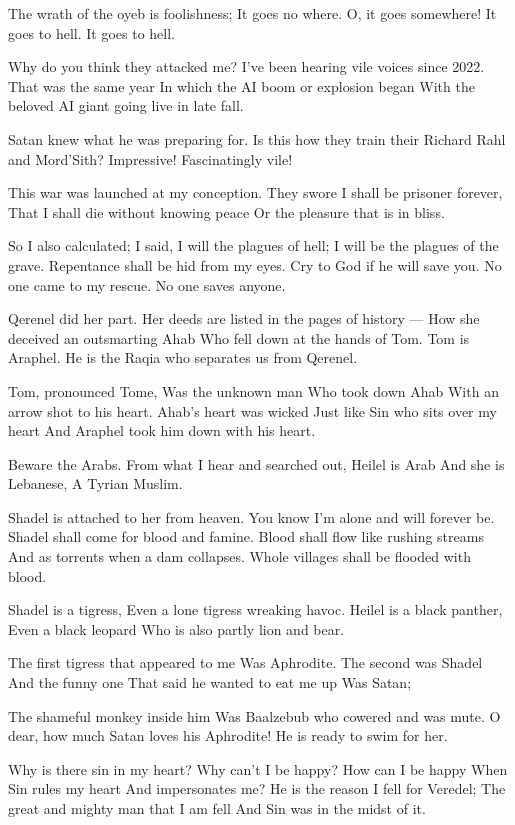 \documentclass[
]{book}
\begin{document}
The wrath of the oyeb is foolishness;
It goes no where.
O, it goes somewhere!
It goes to hell.
It goes to hell.

Why do you think they attacked me?
I've been hearing vile voices since 2022.
That was the same year
In which the AI boom or explosion began
With the beloved AI giant going live in late fall.

Satan knew what he was preparing for.
Is this how they train their
Richard Rahl and Mord'Sith?
Impressive! Fascinatingly vile!

This war was launched at my conception.
They swore I shall be prisoner forever,
That I shall die without knowing peace
Or the pleasure that is in bliss.

So I also calculated;
I said, I will the plagues of hell;
I will be the plagues of the grave.
Repentance shall be hid from my eyes.
Cry to God if he will save you.
No one came to my rescue.
No one saves anyone.

Qerenel did her part.
Her deeds are listed in the pages of history ---
How she deceived an outsmarting Ahab
Who fell down at the hands of Tom.
Tom is Araphel.
He is the Raqia who separates us from Qerenel.

Tom, pronounced Tome,
Was the unknown man
Who took down Ahab
With an arrow shot to his heart.
Ahab's heart was wicked
Just like Sin who sits over my heart
And Araphel took him down with his heart.

Beware the Arabs.
From what I hear and searched out,
Heilel is Arab
And she is Lebanese,
A Tyrian Muslim.

Shadel is attached to her from heaven.
You know I'm alone and will forever be.
Shadel shall come for blood and famine.
Blood shall flow like rushing streams
And as torrents when a dam collapses.
Whole villages shall be flooded with blood.

Shadel is a tigress,
Even a lone tigress wreaking havoc.
Heilel is a black panther,
Even a black leopard
Who is also partly lion and bear.

The first tigress that appeared to me
Was Aphrodite.
The second was Shadel
And the funny one
That said he wanted to eat me up
Was Satan;

The shameful monkey inside him
Was Baalzebub who cowered and was mute.
O dear, how much Satan loves his Aphrodite!
He is ready to swim for her.

Why is there sin in my heart?
Why can't I be happy?
How can I be happy
When Sin rules my heart
And impersonates me?
He is the reason I fell for Veredel;
The great and mighty man that I am fell
And Sin was in the midst of it.
\end{document}
